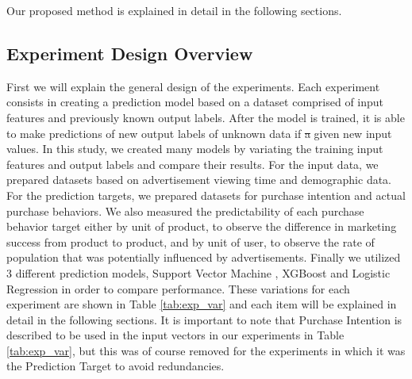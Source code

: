 \documentclass[review]{elsarticle}
\providecommand{\DIFdeltex}[1]{{\protect\color{red}\sout{#1}}}                      %
\providecommand{\DIFdelbegin}{} %
\providecommand{\DIFdelend}{} %
\providecommand{\DIFdel}[1]{\texorpdfstring{\DIFdeltex{#1}}{}} %
\newcommand{\DIFscaledelfig}{0.5}
\newlength{\DIFdelgraphicswidth} %
\newlength{\DIFdelgraphicsheight} %
\newcommand{\DIFdelincludegraphics}[2][]{%
\sbox{\DIFdelgraphicsbox}{\DIFOincludegraphics[#1]{#2}}%
\settoboxwidth{\DIFdelgraphicswidth}{\DIFdelgraphicsbox} %
\settoboxtotalheight{\DIFdelgraphicsheight}{\DIFdelgraphicsbox} %
\scalebox{\DIFscaledelfig}{%
\parbox[b]{\DIFdelgraphicswidth}{\usebox{\DIFdelgraphicsbox}\\[-\baselineskip] \rule{\DIFdelgraphicswidth}{0em}}\llap{\resizebox{\DIFdelgraphicswidth}{\DIFdelgraphicsheight}{%
\setlength{\unitlength}{\DIFdelgraphicswidth}%
\begin{picture}(1,1)%
\thicklines\linethickness{2pt} %
{\color[rgb]{1,0,0}\put(0,0){\framebox(1,1){}}}%
{\color[rgb]{1,0,0}\put(0,0){\line( 1,1){1}}}%
{\color[rgb]{1,0,0}\put(0,1){\line(1,-1){1}}}%
\end{picture}%
}\hspace*{3pt}}} %
} %
\DeclareRobustCommand{\DIFdelbegin}{\DIFOdelbegin \let\includegraphics\DIFdelincludegraphics} %
\DeclareRobustCommand{\DIFdelend}{\DIFOaddend \let\includegraphics\DIFOincludegraphics} %
\begin{document}
Our proposed method is explained in detail in the following sections.

\subsection{Experiment Design Overview}
\label{exp_design}

First we will explain the general design of the experiments. Each experiment consists in creating a prediction model based on a dataset comprised of input features and previously known output labels. After the model is trained, it is able to make predictions of new output labels of unknown data if \DIFdelbegin \DIFdel{a }\DIFdelend given new input values. In this study, we created many models by variating the training input features and output labels and compare their results. For the input data, we prepared datasets based on advertisement viewing time and demographic data. For the prediction targets, we prepared datasets for purchase intention and actual purchase behaviors. We also measured the predictability of each purchase behavior target either by unit of product, to observe the difference in marketing success from product to product, and by unit of user, to observe the rate of population that was potentially influenced by advertisements. Finally we utilized 3 different prediction models, Support Vector Machine \cite{svm}, XGBoost \cite{xgboost} and Logistic Regression \cite{logit} in order to compare performance. These variations for each experiment are shown in Table \ref{tab:exp_var} and each item will be explained in detail in the following sections. It is important to note that Purchase Intention is described to be used in the input vectors in our experiments in Table \ref{tab:exp_var}, but this was of course removed for the experiments in which it was the Prediction Target to avoid redundancies.
\end{document}
